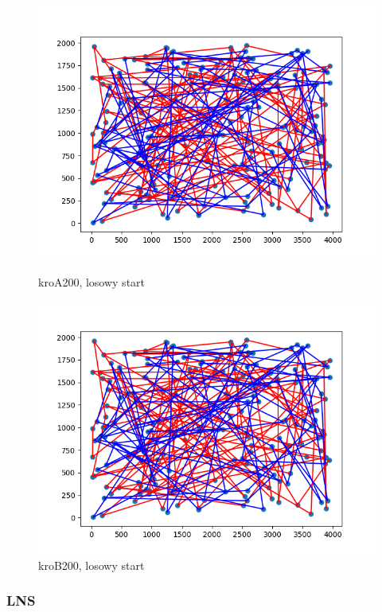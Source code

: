 \documentclass[11pt]{article}
\begin{document}
\begin{figure}[H]
    \begin{minipage}[t]{0.45\textwidth}
        \centering
        \includegraphics[width=\linewidth]{best_paths/kroA200/MSLS}
        \caption{kroA200, losowy start}
    \end{minipage}
    \hfill
    \begin{minipage}[t]{0.45\textwidth}
        \centering
        \includegraphics[width=\linewidth]{best_paths/kroB200/MSLS}
        \caption{kroB200, losowy start}
    \end{minipage}\label{fig:figure3}
\end{figure}


\subsubsection{LNS}
\end{document}
